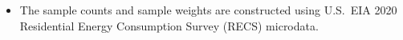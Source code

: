 \begin{itemize}
\item The sample counts and sample weights are constructed using U.S.~EIA 2020 Residential Energy Consumption Survey (RECS) microdata.
\end{itemize}
